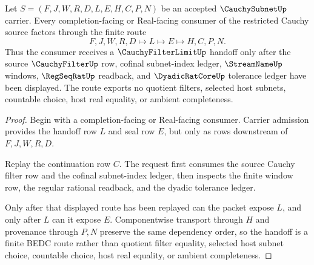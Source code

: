 \begin{theorem}
\label{thm:cauchy-subnet-filter-limit-handoff}
Let $S=(F,J,W,R,D,L,E,H,C,P,N)$ be an accepted $\CauchySubnetUp$ carrier. Every completion-facing or Real-facing consumer of the restricted Cauchy source factors through the finite route
$$
F,J,W,R,D \longmapsto L \longmapsto E \longmapsto H,C,P,N .
$$
Thus the consumer receives a $\CauchyFilterLimitUp$ handoff only after the source $\CauchyFilterUp$ row, cofinal subnet-index ledger, $\StreamNameUp$ windows, $\RegSeqRatUp$ readback, and $\DyadicRatCoreUp$ tolerance ledger have been displayed. The route exports no quotient filters, selected host subnets, countable choice, host real equality, or ambient completeness.
\end{theorem}
\begin{proof}
Begin with a completion-facing or Real-facing consumer. Carrier admission provides the handoff row $L$ and seal row $E$, but only as rows downstream of $F,J,W,R,D$.

Replay the continuation row $C$. The request first consumes the source Cauchy filter row and the cofinal subnet-index ledger, then inspects the finite window row, the regular rational readback, and the dyadic tolerance ledger.

Only after that displayed route has been replayed can the packet expose $L$, and only after $L$ can it expose $E$. Componentwise transport through $H$ and provenance through $P,N$ preserve the same dependency order, so the handoff is a finite BEDC route rather than quotient filter equality, selected host subnet choice, countable choice, host real equality, or ambient completeness.
\end{proof}

